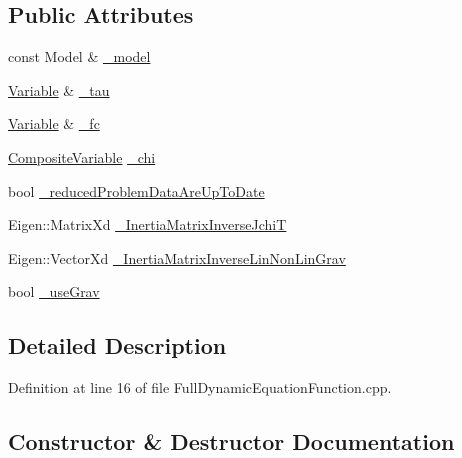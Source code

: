 \subsection*{Public Attributes}
\begin{DoxyCompactItemize}
\item 
const Model \& \hyperlink{structFullDynamicEquationFunction_1_1Pimpl_a180b0f0401cc9ff23b24d974823215d9}{\+\_\+model}
\item 
\hyperlink{classocra_1_1Variable}{Variable} \& \hyperlink{structFullDynamicEquationFunction_1_1Pimpl_a952d62f65cebf67e50d0d6a091f937c4}{\+\_\+tau}
\item 
\hyperlink{classocra_1_1Variable}{Variable} \& \hyperlink{structFullDynamicEquationFunction_1_1Pimpl_ab19caa3b14b35bba6a5dc5ea490cb7b4}{\+\_\+fc}
\item 
\hyperlink{classocra_1_1CompositeVariable}{Composite\+Variable} \hyperlink{structFullDynamicEquationFunction_1_1Pimpl_a795bb07591fdf52c4b60cccfb6b3e811}{\+\_\+chi}
\item 
bool \hyperlink{structFullDynamicEquationFunction_1_1Pimpl_a2712281ce355bde0730d888d8e92b2f8}{\+\_\+reduced\+Problem\+Data\+Are\+Up\+To\+Date}
\item 
Eigen\+::\+Matrix\+Xd \hyperlink{structFullDynamicEquationFunction_1_1Pimpl_a66a532ac843e6bb0255918262e48a947}{\+\_\+\+Inertia\+Matrix\+Inverse\+JchiT}
\item 
Eigen\+::\+Vector\+Xd \hyperlink{structFullDynamicEquationFunction_1_1Pimpl_a5b5154c8b3e5725507192b9055e2b298}{\+\_\+\+Inertia\+Matrix\+Inverse\+Lin\+Non\+Lin\+Grav}
\item 
bool \hyperlink{structFullDynamicEquationFunction_1_1Pimpl_a7a8eb59e31eca20e45bd63f2975ff27b}{\+\_\+use\+Grav}
\end{DoxyCompactItemize}


\subsection{Detailed Description}


Definition at line 16 of file Full\+Dynamic\+Equation\+Function.\+cpp.



\subsection{Constructor \& Destructor Documentation}
\hypertarget{structFullDynamicEquationFunction_1_1Pimpl_acc3b35606d52aa163f27d80f49cb3aaf}{}\label{structFullDynamicEquationFunction_1_1Pimpl_acc3b35606d52aa163f27d80f49cb3aaf} 
